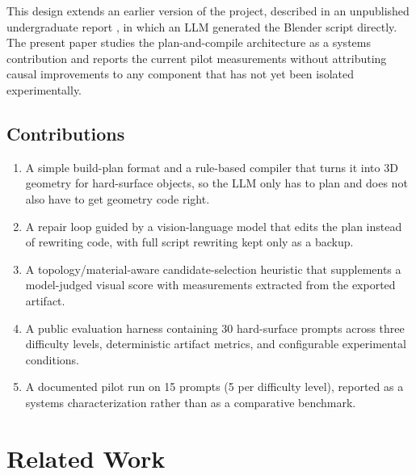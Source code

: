 \documentclass[conference]{IEEEtran}
\begin{document}
This design extends an earlier version of the project, described in an unpublished undergraduate report \cite{dahal2026thesis}, in which an LLM generated the Blender script directly. The present paper studies the plan-and-compile architecture as a systems contribution and reports the current pilot measurements without attributing causal improvements to any component that has not yet been isolated experimentally.

\subsection*{Contributions}
\begin{enumerate}
\item A simple build-plan format and a rule-based compiler that turns it into 3D geometry for hard-surface objects, so the LLM only has to plan and does not also have to get geometry code right.
\item A repair loop guided by a vision-language model that edits the plan instead of rewriting code, with full script rewriting kept only as a backup.
\item A topology/material-aware candidate-selection heuristic that supplements a model-judged visual score with measurements extracted from the exported artifact.
\item A public evaluation harness containing 30 hard-surface prompts across three difficulty levels, deterministic artifact metrics, and configurable experimental conditions.
\item A documented pilot run on 15 prompts (5 per difficulty level), reported as a systems characterization rather than as a comparative benchmark.
\end{enumerate}

\section{Related Work}
\label{sec:related}
\end{document}
